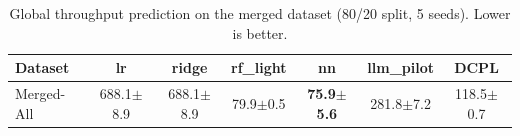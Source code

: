 \begin{table}[t]
\centering
\small
\begin{tabular}{lcccccc}
\toprule
Dataset & lr & ridge & rf_light & nn & llm_pilot & DCPL \\
\midrule
Merged-All & 688.1$\pm$8.9 & 688.1$\pm$8.9 & 79.9$\pm$0.5 & \textbf{75.9$\pm$5.6} & 281.8$\pm$7.2 & 118.5$\pm$0.7 \\
\bottomrule
\end{tabular}

\caption{Global throughput prediction on the merged dataset (80/20 split, 5 seeds). Lower is better.}
\label{tab:global_mre_baseline_vs_dcpl}
\end{table}
